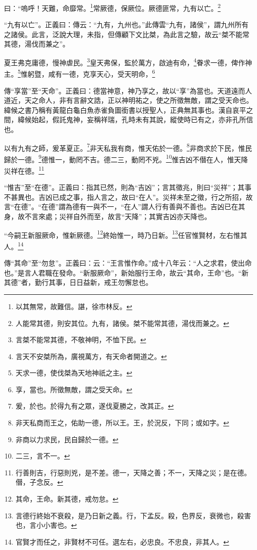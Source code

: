 曰：“嗚呼！天難，命靡常。\footnote{以其無常，故難信。諶，徐巿林反。}常厥德，保厥位。厥德匪常，九有以亡。\footnote{人能常其德，則安其位。九有，諸侯。桀不能常其德，湯伐而兼之。}

{\noindent\shu{}\fzkt “九有以亡”。正義曰：傳云：“九有，九州也。”此傳雲“九有，諸侯”，謂九州所有之諸侯。此言，泛說大理，未指，但傳顧下文比桀，為此言之驗，故云“桀不能常其德，湯伐而兼之”。 \par}

夏王弗克庸德，慢神虐民。\footnote{言桀不能常其德，不敬神明，不恤下民。}皇天弗保，監於萬方，啟迪有命，\footnote{言天不安桀所為，廣視萬方，有天命者開道之。}眷求一德，俾作神主。\footnote{天求一德，使伐桀為天地神祇之主。}惟躬暨，咸有一德，克享天心，受天明命，\footnote{享，當也。所徵無敵，謂之受天命。}

{\noindent\zhuan{}\fzbyks 傳“享當”至“天命”。正義曰：德當神意，神乃享之，故以“享”為當也。天道遠而人道近，天之命人，非有言辭文誥，正以神明祐之，使之所徵無敵，謂之受天命也。緯候之書乃稱有黃龍白龜白魚赤雀負圖銜書以授聖人，正典無其事也。漢自哀平之間，緯候始起，假託鬼神，妄稱祥瑞，孔時未有其說，縱使時已有之，亦非孔所信也。 \par}

以有九有之師，爰革夏正。\footnote{爰，於也。於得九有之眾，遂伐夏勝之，改其正。}非天私我有商，惟天佑於一德。\footnote{非天私商而王之，佑助一德，所以王。王，於況反，下同；或如字。}非商求於下民，惟民歸於一德。\footnote{非商以力求民，民自歸於一德。}德惟一，動罔不吉。德二三，動罔不兇。\footnote{二三，言不一。}惟吉凶不僣在人，惟天降災祥在德。\footnote{行善則吉，行惡則兇，是不差。德一，天降之善；不一，天降之災；是在德。僣，子念反。}

{\noindent\shu{}\fzkt “惟吉”至“在德”。正義曰：指其已然，則為“吉凶”；言其徵兆，則曰“災祥”；其事不甚異也。吉凶已成之事，指人言之，故曰“在人”。災祥未至之徵，行之所招，故言“在德”。“在德”謂為德有一與不一，“在人”謂人行有善與不善也。吉凶已在其身，故不言來處；災祥自外而至，故言“天降”；其實吉凶亦天降也。 \par}

“今嗣王新服厥命，惟新厥德。\footnote{其命，王命。新其德，戒勿怠。}終始惟一，時乃日新。\footnote{言德行終始不衰殺，是乃日新之義。行，下孟反。殺，色界反，衰微也，殺害也，言小小害也。}任官惟賢材，左右惟其人。\footnote{官賢才而任之，非賢材不可任。選左右，必忠良。不忠良，非其人。}


{\noindent\zhuan{}\fzbyks 傳“其命”至“勿怠”。正義曰：云：“王言惟作命。”成十八年云：“人之求君，使出命也。”是言人君職在發命。“新服厥命”，新始服行王命，故云“其命，王命”也。“新其德”者，勤行其事，日日益新，戒王勿懈怠也。 \par}

